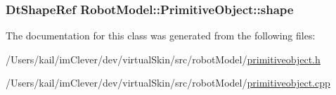 \label{class_robot_model_1_1_primitive_object_a70273cf8bb51ec693445e804f2c1eb34}
\hypertarget{class_robot_model_1_1_primitive_object_ac0e31de5b780652446fdaa06eeec47d6}{
\subsubsection[{shape}]{\setlength{\rightskip}{0pt plus 5cm}DtShapeRef {\bf RobotModel::PrimitiveObject::shape}}}
\label{class_robot_model_1_1_primitive_object_ac0e31de5b780652446fdaa06eeec47d6}


The documentation for this class was generated from the following files:\begin{DoxyCompactItemize}
\item 
/Users/kail/imClever/dev/virtualSkin/src/robotModel/\hyperlink{primitiveobject_8h}{primitiveobject.h}\item 
/Users/kail/imClever/dev/virtualSkin/src/robotModel/\hyperlink{primitiveobject_8cpp}{primitiveobject.cpp}\end{DoxyCompactItemize}
